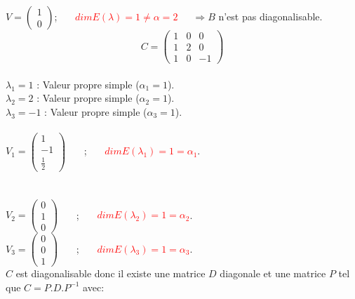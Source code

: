 \documentclass[a4paper,12pt,french]{article}
\begin{document}
	$V=\begin{pmatrix}
		1 \\
		0  
		
	\end{pmatrix}$;~~~ \textcolor{red}{$dim E(\lambda)=1\ne \alpha=2$}~~~$\Rightarrow B$ n'est pas diagonalisable.
	\[ C=\begin{pmatrix}
		1 & 0 & 0  \\
		1 & 2 & 0\\
		1 & 0 & -1
		
	\end{pmatrix}
	\]
	~~~ \\
	$\lambda_{1}=1$ : Valeur propre simple ($\alpha_{1}=1$).\\
	$\lambda_{2}=2$ : Valeur propre simple ($\alpha_{2}=1$).\\
	$\lambda_{3}=-1$ : Valeur propre simple ($\alpha_{3}=1$).\\~~~ \\
	$V_{1}=\begin{pmatrix}
		1  \\
		-1  \\
		\frac{1}{2}
		
	\end{pmatrix}$ ~~~;~~~ \textcolor{red}{$dim E(\lambda_{1})=1=\alpha_{1}$}.\\
	~~~ \\
	~~~ \\
	$V_{2}=\begin{pmatrix}
		0  \\
		1  \\
		0
		
	\end{pmatrix}$ ~~~;~~~ \textcolor{red}{$dim E(\lambda_{2})=1=\alpha_{2}$}.\\
	$V_{3}=\begin{pmatrix}
		0  \\
		0  \\
		1
		
	\end{pmatrix}$ ~~~;~~~ \textcolor{red}{$dim E(\lambda_{3})=1=\alpha_{3}$}.\\
	
	$C$ est diagonalisable donc il existe une matrice $D$ diagonale et une matrice $P$ tel que $C=P.D.P^{-1}$ avec:\\
	
\end{document}
